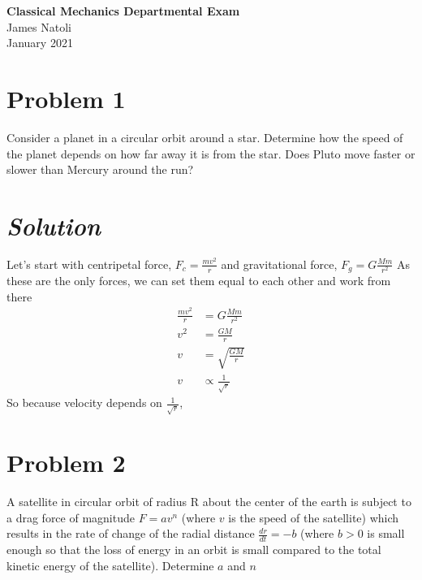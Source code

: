 \documentclass{article}
\begin{document}
\thispagestyle{empty}
\begin{center}\Large \textbf{Classical Mechanics Departmental Exam} \\
\normalsize James Natoli \\  January 2021
\end{center}

\section*{Problem 1} 
Consider a planet in a circular orbit around a star. Determine how the speed of the planet depends on how far away it is from the star. Does Pluto move faster or slower than Mercury around the run?
\section*{\textit{Solution}} 
Let's start with centripetal force, $ F_c = \frac{mv^2}{r}$ and gravitational force, $F_g = G\frac{Mm}{r^2}$
As these are the only forces, we can set them equal to each other and work from there
\begin{align}
\frac{mv^2}{r} &= G\frac{Mm}{r^2} \\
v^2 &= \frac{GM}{r} \\
v &= \sqrt{\frac{GM}{r}} \\
v &\propto \frac{1}{\sqrt{r}} 
\end{align}
So because velocity depends on $ \frac{1}{\sqrt{r}}$, 
\section*{Problem 2} 
A satellite in circular orbit of radius R about the center of the earth is subject to a drag force of magnitude $F = av^n$ (where $v$ is the speed of the satellite) which results in the rate of change of the radial distance $\frac{dr}{dt} = -b$ (where $b > 0$ is small enough so that the loss of energy in an orbit is small compared to the total kinetic energy of the satellite). Determine $a$ and $n$
\end{document}
